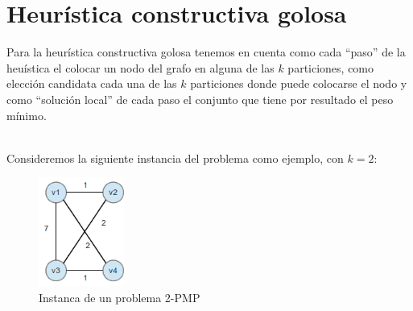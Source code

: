 \section{Heur\'istica constructiva golosa}

Para la heur\'istica constructiva golosa tenemos en cuenta como cada ``paso'' de la heu\'istica el colocar un nodo del grafo en alguna
de las $k$ particiones, como elecci\'on candidata cada una de las $k$ particiones donde puede colocarse el nodo y como ``soluci\'on local'' de
cada paso el conjunto que tiene por resultado el peso m\'inimo. \\\

Consideremos la siguiente instancia del problema como ejemplo, con $k=2$:
\begin{figure}[h!]
  \centering
  \includegraphics[width=0.25\textwidth]{ej3/greedy_graph_example1.png}
  \caption{Instanca de un problema 2-PMP}
\end{figure}

